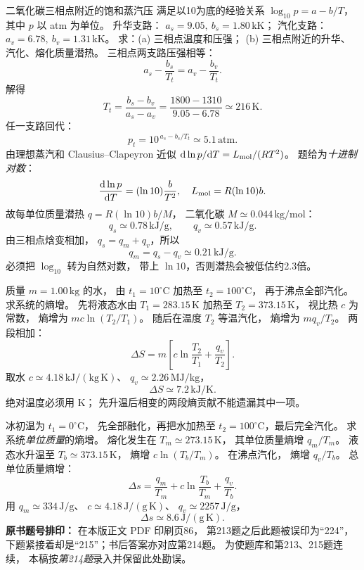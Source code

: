 二氧化碳三相点附近的饱和蒸汽压
满足以10为底的经验关系
$\log_{10}p=a-b/T$，
其中 $p$ 以 atm 为单位。
升华支路：
$a_s=9.05,\ b_s=1.80\,\mathrm{kK}$；
汽化支路：
$a_v=6.78,\ b_v=1.31\,\mathrm{kK}$。
求：(a) 三相点温度和压强；
(b) 三相点附近的升华、汽化、熔化质量潜热。
\exsolution
三相点两支路压强相等：
\[
a_s-\frac{b_s}{T_t}
=a_v-\frac{b_v}{T_t}.
\]
解得
\[
\boxed{T_t=\frac{b_s-b_v}{a_s-a_v}
=\frac{1800-1310}{9.05-6.78}
\simeq216\,\mathrm K}.
\]
任一支路回代：
\[
\boxed{p_t=10^{\,a_s-b_s/T_t}
\simeq5.1\,\mathrm{atm}}.
\]
由理想蒸汽和 Clausius--Clapeyron 近似
$\mathrm d\ln p/\mathrm dT
=L_{\rm mol}/(RT^2)$。
题给为\emph{十进制对数}：
\[
\frac{\mathrm d\ln p}{\mathrm dT}
=(\ln10)\frac b{T^2},
\quad L_{\rm mol}=R(\ln10)b.
\]
故每单位质量潜热
$q=R(\ln10)b/M$，
二氧化碳 $M\simeq0.044\,\mathrm{kg/mol}$：
\[
\boxed{q_s\simeq0.78\,\mathrm{kJ/g}},\qquad
\boxed{q_v\simeq0.57\,\mathrm{kJ/g}}.
\]
由三相点焓变相加，
$q_s=q_m+q_v$，所以
\[
\boxed{q_m=q_s-q_v\simeq0.21\,\mathrm{kJ/g}}.
\]
\excheck 必须把 $\log_{10}$ 转为自然对数，
带上 $\ln10$，否则潜热会被低估约2.3倍。

质量 $m=1.00\,\mathrm{kg}$ 的水，
由 $t_1=10^\circ\mathrm C$ 加热至
$t_2=100^\circ\mathrm C$，
再于沸点全部汽化。
求系统的熵增。
\exsolution
先将液态水由
$T_1=283.15\,\mathrm K$
加热至
$T_2=373.15\,\mathrm K$，
视比热 $c$ 为常数，
熵增为
$m c\ln(T_2/T_1)$。
随后在温度 $T_2$ 等温汽化，
熵增为
$m q_v/T_2$。
两段相加：
\[
\boxed{\Delta S=
m\left[c\ln\frac{T_2}{T_1}+\frac{q_v}{T_2}\right]}.
\]
取水 $c\simeq4.18\,\mathrm{kJ/(kg\,K)}$、
$q_v\simeq2.26\,\mathrm{MJ/kg}$，
\[
\boxed{\Delta S\simeq7.2\,\mathrm{kJ/K}}.
\]
\excheck 绝对温度必须用 K；
先升温后相变的两段熵贡献不能遗漏其中一项。

冰初温为 $t_1=0^\circ\mathrm C$，
先全部融化，再把水加热至
$t_2=100^\circ\mathrm C$，最后完全汽化。
求系统\emph{单位质量}的熵增。
\exsolution
熔化发生在
$T_m\simeq273.15\,\mathrm K$，
其单位质量熵增
$q_m/T_m$。
液态水升温至
$T_b\simeq373.15\,\mathrm K$，
熵增
$c\ln(T_b/T_m)$。
在沸点汽化，
熵增
$q_v/T_b$。
总单位质量熵增：
\[
\boxed{\Delta s=
\frac{q_m}{T_m}
+c\ln\frac{T_b}{T_m}
+\frac{q_v}{T_b}}.
\]
用
$q_m\simeq334\,\mathrm{J/g}$、
$c\simeq4.18\,\mathrm{J/(g\,K)}$、
$q_v\simeq2257\,\mathrm{J/g}$，
\[
\boxed{\Delta s\simeq8.6\,\mathrm{J/(g\,K)}}.
\]
\excheck \textbf{原书题号排印：}
在本版正文 PDF 印刷页86，
第213题之后此题被误印为“224”，
下题紧接着却是“215”；书后答案亦对应第214题。
为使题库和第213、215题连续，
本稿按\emph{第214题}录入并保留此处勘误。
